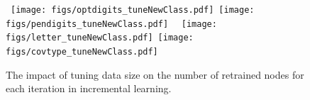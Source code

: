 \begin{figure}[thbp]
\centering
\mbox{
\texttt{[image: figs/optdigits\_tuneNewClass.pdf]}
\texttt{[image: figs/pendigits\_tuneNewClass.pdf]}
}
\mbox{
\texttt{[image: figs/letter\_tuneNewClass.pdf]}
\texttt{[image: figs/covtype\_tuneNewClass.pdf]}
}
\vspace{-.07in}
\caption{The impact of tuning data size on the number of retrained nodes for each iteration in incremental learning.}
\label{fig:finetune_classes}

\vspace{-.1in}
\end{figure}